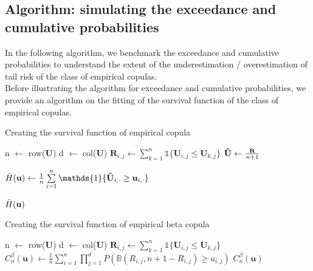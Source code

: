 \documentclass[12pt]{report}
\newcommand{\1}{\mathbf{1}}
\begin{document}
\begin{flushleft}
\subsection{Algorithm: simulating the exceedance and cumulative probabilities}
\vspace{0.5cm}
In the following algorithm, we benchmark the exceedance and cumulative probabilities to understand the extent of the underestimation / overestimation of tail risk of the class of empirical copulas. \\
\vspace{0.5cm}
Before illustrating the algorithm for exceedance and cumulative probabilities, we provide an algorithm on the fitting of the survival function of the class of empirical copulas.\\
\newpage
\begin{algorithm}[H]
\caption{Creating the survival function of empirical copula}
\begin{algorithmic}
    \State n $\gets$ row($\mathbf{U}$)
    \State d $\gets$ col($\mathbf{U}$)
            \State $\textbf{R}_{i,j} \gets \sum\limits_{k = 1}^{n} \mathds{1} \{ \textbf{U}_{i,j} \le \textbf{U}_{k,j} \}$
        \EndFor
    \EndFor
    \State $\mathbf{\Hat{U}} \gets \frac{\mathbf{R}}{n + 1}$ 
    
    \State $ \Bar{H}(\textbf{u}) \gets \frac{1}{n} \sum\limits_{i = 1}^{n} \mathds{1}\{\mathbf{\Hat{U}}_{i,\cdot} \ge \mathbf{u}_{i,\cdot}\}$ 
    
    \State \Return $\Bar{H}(\textbf{u})$
\EndProcedure
\end{algorithmic}
\end{algorithm}

\begin{algorithm}[H]
\caption{Creating the survival function of empirical beta copula}
\begin{algorithmic}
    \State n $\gets$ row($\mathbf{U}$)
    \State d $\gets$ col($\mathbf{U}$)
            \State $\textbf{R}_{i,j} \gets \sum\limits_{k = 1}^{n} \mathds{1} \{ \textbf{U}_{i,j} \le \textbf{U}_{k,j} \}$
        \EndFor
    \EndFor
    \State $C^{\beta}_{n}(\textbf{u}) \gets \frac{1}{n}\sum\limits_{i = 1}^{n} \prod\limits_{j = 1}^{d} P(\mathbb{B}(R_{i,j}, n + 1 - R_{i,j}) \ge u_{i,j})$
    \State \Return $C^{\beta}_{n}(\textbf{u})$
\EndProcedure
\end{algorithmic}
\end{algorithm}


\end{flushleft}
\end{document}
